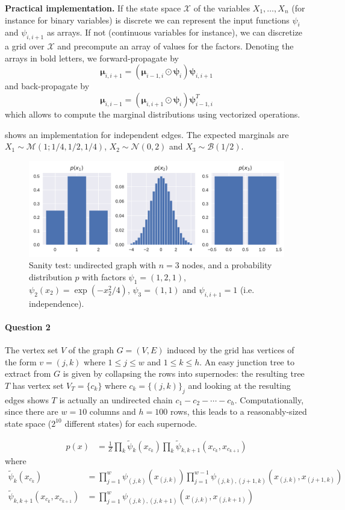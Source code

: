 \documentclass[11pt]{article}
\newcommand{\calM}{\mathcal{M}}
\newcommand{\calN}{\mathcal{N}}
\newcommand{\calX}{\mathcal{X}}
\newcommand{\bmmu}{\boldsymbol{\mu}}
\newcommand{\bmpsi}{\boldsymbol{\psi}}
\begin{document}
\textbf{Practical implementation.} If the state space $\calX$ of the variables $X_1,\ldots,X_n$ (for instance for binary variables) is discrete we can represent the input functions $\psi_i$ and $\psi_{i,i+1}$ as arrays. If not (continuous variables for instance), we can discretize a grid over $\calX$ and precompute an array of values for the factors.
Denoting the arrays in bold letters, we forward-propagate by
\[
	\bmmu_{i, i+1} =
	(\bmmu_{i-1, i} \odot \bmpsi_i)\bmpsi_{i,i+1}
\]
and back-propagate by
\[
	\bmmu_{i,i-1} = (\bmmu_{i,i+1} \odot \bmpsi_i) \bmpsi_{i-1,i}^T
\]
which allows to compute the marginal distributions using vectorized operations.

 shows an implementation for independent edges. The expected marginals are $X_1 \sim \calM(1;1/4,1/2,1/4)$, $X_2\sim \calN(0,2)$ and $X_3 \sim \mathcal{B}(1/2)$.

\begin{figure}
	\centering
	\includegraphics[width=.9\linewidth]{images/graphs/independent_undirected_chain.pdf}
	\caption{Sanity test: undirected graph with $n=3$ nodes, and a probability distribution $p$ with factors $\psi_1 = (1, 2, 1)$, $\psi_2(x_2) = \exp(-x_2^2/4)$, $\psi_3 = (1,1)$ and $\psi_{i,i+1} = 1$ (i.e. independence).}\label{fig:IndependentNodeUGM}
\end{figure}



\paragraph{Question 2} The vertex set $V$ of the graph $G = (V,E)$ induced by the grid has vertices of the form $v = (j,k)$ where $1\leq j \leq w$ and $1 \leq k \leq h$. An easy junction tree to extract from $G$ is given by collapsing the rows into supernodes: the resulting tree $T$ has vertex set $V_T = \{c_k\}$ where $c_k = \{(j,k)\}_j$ and looking at the resulting edges shows $T$ is actually an undirected chain $c_1-c_2 -\cdots-c_h$. Computationally, since there are $w=10$ columns and $h=100$ rows, this leads to a reasonably-sized state space ($2^{10}$ different states) for each supernode.

\begin{align*}
	p(x) &= \frac{1}{Z}\prod_k
	\tilde{\psi}_k(x_{c_k})
	\prod_k
	\tilde{\psi}_{k,k+1}(x_{c_k},x_{c_{k+1}})
\end{align*}
where 
\begin{align*}
	\tilde{\psi}_k(x_{c_k}) &= \prod_{j=1}^w \psi_{(j,k)} (x_{(j,k)}) 
	\prod_{j=1}^{w-1} \psi_{(j,k),(j+1,k)}(x_{(j,k)}, x_{(j+1,k)})  \\
	\tilde{\psi}_{k,k+1}(x_{c_k}, x_{c_{k+1}}) &=
	\prod_{j=1}^w \psi_{(j,k),(j,k+1)}(x_{(j,k)},x_{(j,k+1)})
\end{align*}
\end{document}
